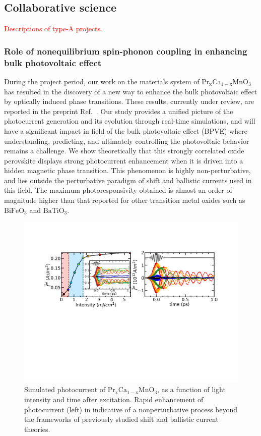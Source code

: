 \subsection{Collaborative science}

\textcolor{red}{Descriptions of type-A projects.}

\subsubsection{Role of nonequilibrium spin-phonon coupling in enhancing bulk photovoltaic effect}\label{sec:BPVE}

During the project period, our work on the materials system of \(\mathrm{Pr_xCa_{1-x}MnO_3}\) has resulted in the discovery of a new way to enhance the bulk photovoltaic effect by optically induced phase transitions. 
These results, currently under review, are reported in the preprint Ref.~\cite{Rajpurohit2021}. 
Our study provides a unified picture of the photocurrent generation and its evolution through real-time simulations, and will have a significant impact in field of the bulk photovoltaic effect (BPVE) where understanding, predicting, and ultimately controlling the photovoltaic behavior remains a challenge.
We show theoretically that this strongly correlated oxide perovskite displays strong photocurrent enhancement when it is driven into a hidden magnetic phase transition.
This phenomenon is highly non-perturbative, and lies outside the perturbative paradigm of shift and ballistic currents used in this field. 
The maximum photoresponsivity obtained is almost an order of magnitude higher than that reported for other transition metal oxides such as \(\mathrm{BiFeO_3}\) and \(\mathrm{BaTiO_3}\).

\begin{figure}[ht]
	\centering\includegraphics[width=1.0\linewidth]{figures/photocurrent_old}
	\caption{
		Simulated photocurrent of \(\mathrm{Pr_xCa_{1-x}MnO_3}\), as a function of light intensity and time after excitation. 
		Rapid enhancement of photocurrent (left) in indicative of a nonperturbative process beyond the frameworks of previously studied shift and ballistic current theories.
	}
	\label{fig:PCMO}
\end{figure}

